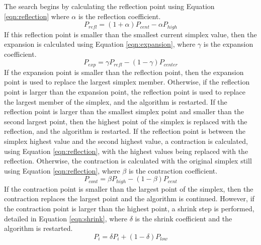 The search begins by calculating the reflection point using Equation \ref{eqn:reflection} where $\alpha$ is the reflection coefficient.
	\begin{equation}\label{eqn:reflection}
		P_{refl} = (1 + \alpha) P_{cent} - \alpha P_{high}
	\end{equation}
If this reflection point is smaller than the smallest current simplex value, then the expansion is calculated using Equation \ref{eqn:expansion}, where $\gamma$ is the expansion coefficient.
	\begin{equation}\label{eqn:expansion}
		P_{exp} = \gamma P_{refl} - (1 - \gamma) P_{center}
	\end{equation}
If the expansion point is smaller than the reflection point, then the expansion point is used to replace the largest simplex member.  Otherwise, if the reflection point is larger than the expansion point, the reflection point is used to replace the largest member of the simplex, and the algorithm is restarted.
If the reflection point is larger than the smallest simplex point and smaller than the second largest point, then the highest point of the simplex is replaced with the reflection, and the algorithm is restarted. 
If the reflection point is between the simplex highest value and the second highest value, a contraction is calculated, using Equation \ref{eqn:reflection}, with the highest values being replaced with the reflection.  Otherwise, the contraction is calculated with the original simplex still using Equation \ref{eqn:reflection}, where $\beta$ is the contraction coefficient.
	\begin{equation}\label{eqn:contraction}
		P_{cont} = \beta P_{high} - (1 - \beta) P_{cent}	
	\end{equation}
If the contraction point is smaller than the largest point of the simplex, then the contraction replaces the largest point and the algorithm is continued.
However, if the contraction point is larger than the highest point, a shrink step is performed, detailed in Equation \ref{eqn:shrink}, where $\delta$ is the shrink coefficient and the algorithm is restarted.
	\begin{equation}\label{eqn:shrink}
		P_{i} = \delta P_{i} + (1 - \delta) P_{low}
	\end{equation}